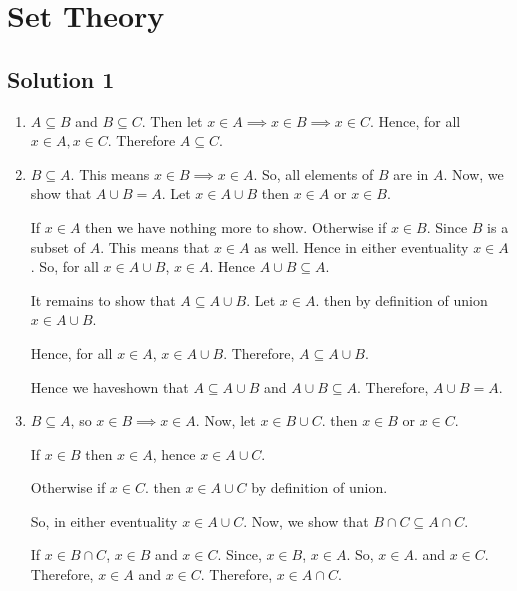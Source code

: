 \section{Set Theory}


\subsection{Solution 1}

\begin{enumerate}
  \item \( A  \subseteq B\) and \( B \subseteq C \). Then let \( x \in  A  \implies x \in B \implies x \in  C\).
    Hence, for all \( x \in A, x \in C \). Therefore \( A \subseteq C. \)

    \item \( B \subseteq A \). This means \( x \in  B \implies x \in  A \).
      So, all elements of \( B \) are in \( A. \)
      Now, we show that \( A \cup B = A.\)
      Let \( x \in  A \cup B  \) then \( x \in  A  \) or \( x \in  B \).

      If \( x \in  A \) then we have nothing more to show. Otherwise if \( x \in  B \).
      Since \(  B  \) is a subset of \( A \). This means that \( x \in  A \) as well.
      Hence in either eventuality \( x \in  A \). So, for all \( x \in  A \cup  B \), \( x \in  A \).
      Hence \( A \cup  B \subseteq A \).

      It remains to show that \( A \subseteq A \cup  B \).
      Let \( x \in  A  \). then by definition of union \( x \in  A \cup  B \).
      
      Hence, for all \( x \in  A \), \( x \in  A \cup  B \). Therefore, 
      \( A \subseteq A \cup  B \).

      Hence we haveshown that \( A \subseteq A\cup  B \) and \( A \cup  B \subseteq A \).
      Therefore, \( A \cup  B = A \).

      \item \( B \subseteq A \), so \( x \in  B  \implies x \in  A\). Now,
        let \( x \in  B \cup  C \). then \( x \in  B \) or \( x \in  C \).

      If \( x \in  B \) then \( x \in  A \), hence \( x \in  A \cup  C \).

      Otherwise if \( x \in  C \). then \( x \in  A \cup  C \) by definition of union.

      So, in either eventuality \( x \in  A \cup  C \). 
      Now, we show that \( B \cap C \subseteq A \cap  C \).

      If \( x \in  B \cap C \), \( x \in  B \) and \( x \in  C \). Since, \( x \in  B \), \( x \in  A \). So, \( x \in  A \). and \( x \in  C \).
      Therefore, \( x \in A \) and \( x \in  C \). Therefore, \( x \in  A \cap C \).
\end{enumerate}

